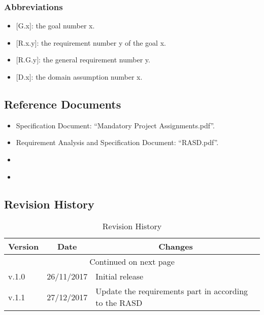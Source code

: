 \subsubsection{Abbreviations}
\begin{itemize}
\renewcommand{\labelitemi}{$-$}
\item
$[$G.x$]$: the goal number x.
\item
$[$R.x.y$]$: the requirement number y of the goal x.
\item
$[$R.G.y$]$: the general requirement number y.
\item
$[$D.x$]$: the domain assumption number x.
\end{itemize}

\subsection{Reference Documents}
\begin{itemize}
\renewcommand\labelitemi{-}
\item
Specification Document: “Mandatory Project Assignments.pdf”.
\item
Requirement Analysis and Specification Document: “RASD.pdf”.
\item
\href{http://ieeexplore.ieee.org/document/5167255/}{\color{Black}{IEEE 1016-2009 - IEEE Standard for Information Technology--Systems Design--Software Design Descriptions.}}
\item
\href{https://www.uml-diagrams.org/}{\color{Black}{UML guide site.}}
\end{itemize}

\clearpage
\subsection{Revision History}
\begin{center}
\begin{longtable}{|p{2cm} | p{3cm}| p{8cm}|}
\hline \multicolumn{1}{|c|}{\textbf{Version}} & \multicolumn{1}{c|}{\textbf{Date}} & \multicolumn{1}{c|}{\textbf{Changes}} \\ \hline 
\endfirsthead
\hline
\endhead
\hline \multicolumn{3}{c}{{Continued on next page}} \\
\endfoot
\hline
\caption{Revision History}
\label{ref:revision}
\endlastfoot
v.1.0 & 26/11/2017 & Initial release \\
\hline 
v.1.1 & 27/12/2017 & Update the requirements part in according to the RASD \\  
\end{longtable}
\end{center}

